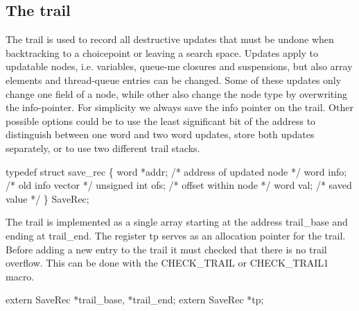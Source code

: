 %
%
\subsection{The trail}
The trail is used to record all destructive updates that must be
undone when backtracking to a choicepoint or leaving a search
space. Updates apply to updatable nodes, i.e. variables, queue-me
closures and suspensions, but also array elements and thread-queue
entries can be changed. Some of these updates only change one field of
a node, while other also change the node type by overwriting the
info-pointer. For simplicity we always save the info pointer on the
trail. Other possible options could be to use the least significant
bit of the address to distinguish between one word and two word
updates, store both updates separately, or to use two different trail
stacks.

\nwenddocs{}\endmoddef\nwstartdeflinemarkup{}\nwenddeflinemarkup
typedef struct save_rec \{
    word         *addr;         /* address of updated node */
    word         info;          /* old info vector */
    unsigned int ofs;           /* offset within node */
    word         val;           /* saved value */
\} SaveRec;

\nwendcode{}\nwdocspar
The trail is implemented as a single array starting at the address
{\Tt{}trail{\_}base\nwendquote} and ending at {\Tt{}trail{\_}end\nwendquote}. The register {\Tt{}tp\nwendquote}
serves as an allocation pointer for the trail. Before adding a new
entry to the trail it must checked that there is no trail
overflow. This can be done with the {\Tt{}CHECK{\_}TRAIL\nwendquote} or
{\Tt{}CHECK{\_}TRAIL1\nwendquote} macro.

\nwenddocs{}\plusendmoddef\nwstartdeflinemarkup{}\nwenddeflinemarkup
extern SaveRec *trail_base, *trail_end;
extern SaveRec *tp;

